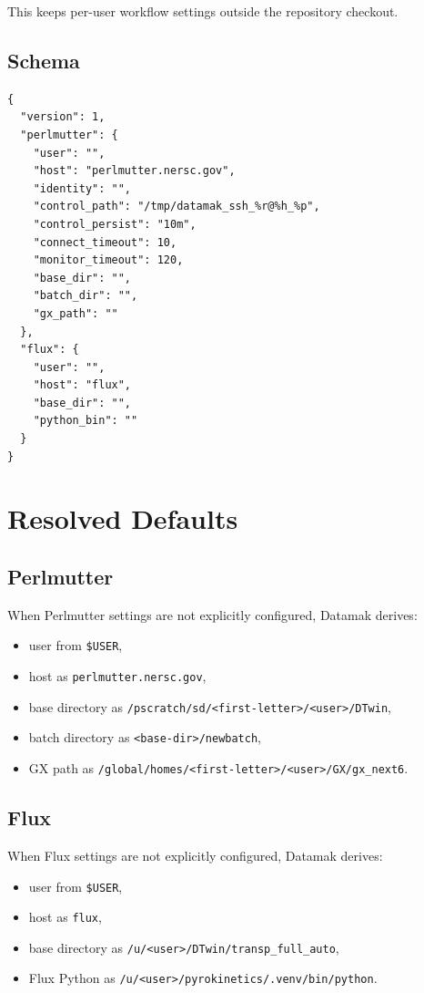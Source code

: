 \documentclass[11pt]{article}
\newcommand{\code}[1]{\texttt{#1}}
\begin{document}
This keeps per-user workflow settings outside the repository checkout.

\subsection{Schema}

\begin{verbatim}
{
  "version": 1,
  "perlmutter": {
    "user": "",
    "host": "perlmutter.nersc.gov",
    "identity": "",
    "control_path": "/tmp/datamak_ssh_%r@%h_%p",
    "control_persist": "10m",
    "connect_timeout": 10,
    "monitor_timeout": 120,
    "base_dir": "",
    "batch_dir": "",
    "gx_path": ""
  },
  "flux": {
    "user": "",
    "host": "flux",
    "base_dir": "",
    "python_bin": ""
  }
}
\end{verbatim}

\section{Resolved Defaults}

\subsection{Perlmutter}

When Perlmutter settings are not explicitly configured, Datamak derives:

\begin{itemize}
\item user from \code{\$USER},
\item host as \code{perlmutter.nersc.gov},
\item base directory as \code{/pscratch/sd/<first-letter>/<user>/DTwin},
\item batch directory as \code{<base-dir>/newbatch},
\item GX path as \code{/global/homes/<first-letter>/<user>/GX/gx\_next6}.
\end{itemize}

\subsection{Flux}

When Flux settings are not explicitly configured, Datamak derives:

\begin{itemize}
\item user from \code{\$USER},
\item host as \code{flux},
\item base directory as \code{/u/<user>/DTwin/transp\_full\_auto},
\item Flux Python as \code{/u/<user>/pyrokinetics/.venv/bin/python}.
\end{itemize}
\end{document}
